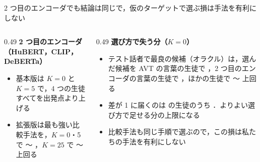 \begin{frame}{2 つ目のエンコーダでも結論は同じで，仮のターゲットで選ぶ損は手法を有利にしない}
  \vspace{0.3em}
  \begin{columns}[T,onlytextwidth]
    \begin{column}{0.49\textwidth}
      \textbf{\footnotesize 2 つ目のエンコーダ（HuBERT，CLIP，DeBERTa）}\par\vspace{0.2em}
      \begin{itemize}\scriptsize\setlength{\itemsep}{5pt}
        \item 基本版は $K=0$ と $K=5$ で，4 つの生徒すべてを出発点より上げる
        \item 拡張版は最も強い比較手法を，$K=0$・5 で 〜 \pt，$K=25$ で 〜 \pt 上回る
      \end{itemize}
    \end{column}
    \begin{column}{0.49\textwidth}
      \textbf{\footnotesize 選び方で失う分（$K=0$）}\par\vspace{0.2em}
      \begin{itemize}\scriptsize\setlength{\itemsep}{5pt}
        \item テスト話者で最良の候補（オラクル）は，選んだ候補を AVT の言葉の生徒で ，2 つ目のエンコーダの言葉の生徒で ，ほかの生徒で 〜 \pt 上回る
        \item 差が 1 \pt に届くのは  の生徒のうち ．よりよい選び方で足せる分の上限になる
        \item 比較手法も同じ手順で選ぶので，この損は私たちの手法を有利にしない
      \end{itemize}
    \end{column}
  \end{columns}
  \vspace{0.6em}
\end{frame}
